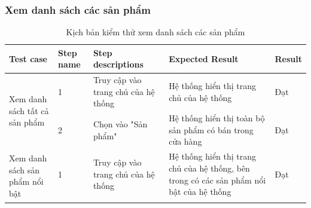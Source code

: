 \subsubsection{Xem danh sách các sản phẩm}
{
    \setlength\extrarowheight{6pt}
    \begin{longtable}{| p{2.5cm}| p{1cm}| p{5.5cm}| p{4.5cm} | p{1.5cm} |}
        \hline
        \textbf{Test case}                                                                       & \textbf{Step name} & \textbf{Step descriptions} & \textbf{Expected Result} & \textbf{Result} \\
        \hline
        \multirow[t]{2}{2.5cm}{Xem danh sách tất cả sản phẩm}                                    &
        1                                                                                        &
        Truy cập vào trang chủ của hệ thống                                                      &
        Hệ thống hiển thị trang chủ của hệ thống                                                 &
        Đạt                                                                                                                                                                                     \\
        \cline{2-5}
                                                                                                 & 2                  &
        Chọn vào "Sản phẩm"                                                                      &
        Hệ thống hiển thị toàn bộ sản phẩm có bán trong cửa hàng                                 &
        Đạt                                                                                                                                                                                     \\
        \hline
        \multirow[t]{2}{2.5cm}{Xem danh sách sản phẩm nổi bật}                                   &
        1                                                                                        &
        Truy cập vào trang chủ của hệ thống                                                      &
        Hệ thống hiển thị trang chủ của hệ thống, bên trong có các sản phẩm nổi bật của hệ thống &
        Đạt                                                                                                                                                                                     \\
        \hline
        \caption{Kịch bản kiểm thử xem danh sách các sản phẩm}
    \end{longtable}
}

